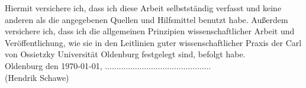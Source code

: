 \thispagestyle{empty}
Hiermit versichere ich, dass ich diese Arbeit selbstständig verfasst und
keine anderen als die angegebenen Quellen und Hilfsmittel benutzt habe.
Außerdem versichere ich, dass ich die allgemeinen Prinzipien
wissenschaftlicher Arbeit und Veröffentlichung, wie sie in den
Leitlinien guter wissenschaftlicher Praxis der Carl von Ossietzky
Universität Oldenburg festgelegt sind, befolgt habe.\\[3cm]

\raggedleft
\hfill Oldenburg den \today, ..............................................\\
\hfill (Hendrik Schawe)\\
